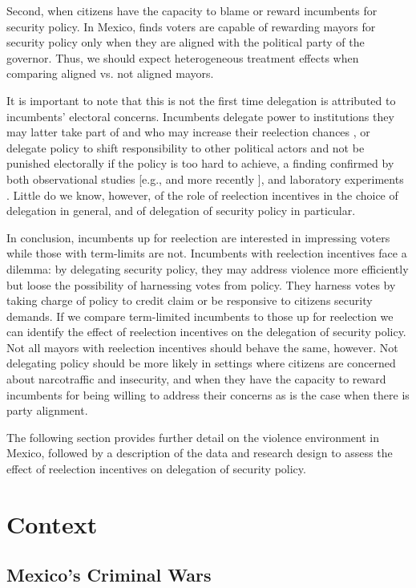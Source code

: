 Second, when citizens have the capacity to blame or reward incumbents for security policy. In Mexico, \citet{ley_2017} finds voters are capable of rewarding mayors for security policy only when they are aligned with the political party of the governor. Thus, we should expect heterogeneous treatment effects when comparing aligned vs. not aligned mayors.

It is important to note that this is not the first time delegation is attributed to incumbents' electoral concerns. Incumbents delegate power to institutions they may latter take part of and who may increase their reelection chances \citep{mccubbins_1991}, or delegate policy to shift responsibility to other political actors and not be punished electorally if the policy is too hard to achieve, a finding confirmed by both observational studies [e.g., \citet{fiorina_1982} and more recently \citep{loftis_2014}],  and laboratory experiments \citep{bartling_fischbacher_2012}. Little do we know, however, of the role of reelection incentives in the choice of delegation in general, and of delegation of security policy in particular. 

In conclusion, incumbents up for reelection are interested in impressing voters while those with term-limits are not. Incumbents with reelection incentives face a dilemma: by delegating security policy, they may address violence more efficiently but loose the possibility of harnessing votes from policy. They harness votes by taking charge of policy to credit claim or be responsive to citizens security demands. If we compare term-limited incumbents to those up for reelection we can identify the effect of reelection incentives on the delegation of security policy. Not all mayors with reelection incentives should behave the same, however. Not delegating policy should be more likely in settings where citizens are concerned about narcotraffic and insecurity, and when they have the capacity to reward incumbents for being willing to address their concerns as is the case when there is party alignment. 

The following section provides further detail on the violence environment in Mexico, followed by a description of the data and research design to assess the effect of reelection incentives on delegation of security policy. 
         
 \section{Context} 
\subsection{Mexico's Criminal Wars \label{sec:war_drugs}}

